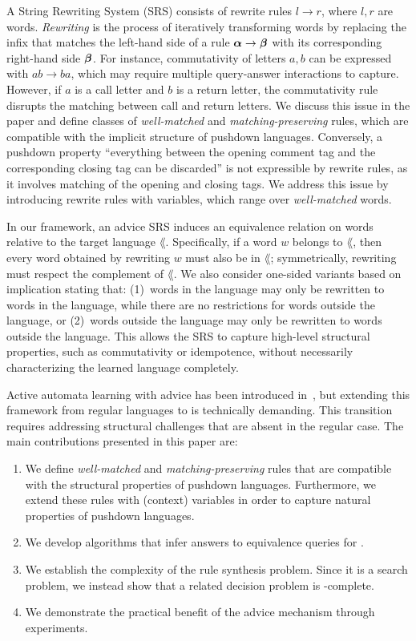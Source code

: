 A String Rewriting System (SRS) consists of rewrite rules $l \rightarrow r$, where $l,r$ are words.
\emph{Rewriting} is the process of iteratively transforming words by replacing the infix that matches the left-hand side of a rule $\boldsymbol{\alpha} \to \boldsymbol{\beta}$ with its corresponding right-hand side $\boldsymbol{\beta}$.                 
For instance, commutativity of letters $a,b$ can be expressed with $ab \to ba$, which may require multiple query-answer interactions to capture.
However, if $a$ is a call letter and $b$ is a return letter, 
the commutativity rule disrupts the matching between call and return letters. 
We discuss this issue in the paper and define classes of
\emph{well-matched} and \emph{matching-preserving}
 rules, which are compatible with the implicit structure of pushdown languages. 
Conversely, a pushdown property ``everything between the opening comment tag and the corresponding closing tag can be discarded''
is not expressible by rewrite rules, as it involves matching of the opening and closing tags.
We address this issue by introducing rewrite rules with variables, which range over      \emph{well-matched} words.

In our framework, an advice SRS induces an equivalence relation on words relative to the target language  $\lang$.
Specifically, if a word $w$ belongs to $\lang$, then every word obtained by rewriting $w$ must also be in $\lang$; symmetrically, rewriting must respect the complement of $\lang$. 
We also consider one-sided variants based on implication stating that:  
(1)~words in the language may only be rewritten to words in the language, while there are no restrictions for words outside the language, or
(2)~words outside the language may only be rewritten to words outside the language.
This allows the SRS to capture high-level structural properties, such as commutativity or idempotence, without necessarily characterizing the learned language completely.

Active automata learning with advice has been introduced in~\cite{ecai25}, but extending this framework 
from regular languages to \VPLs is technically demanding. 
This transition requires addressing structural challenges that are absent in the regular case.
The main contributions presented in this paper are:  
\begin{enumerate}
    \item 
    We define \emph{well-matched} and \emph{matching-preserving} rules that are compatible with the structural properties of pushdown languages.
    Furthermore, we extend these rules with (context) variables in order to capture natural properties of pushdown languages.
    \item We develop algorithms that infer answers to equivalence queries for \DVPA. 
    \item We establish the complexity of the rule synthesis problem.
    Since it is a search problem, we instead show that a related decision problem is \NP-complete.
    \item We demonstrate the practical benefit of the advice mechanism through experiments.
\end{enumerate}


